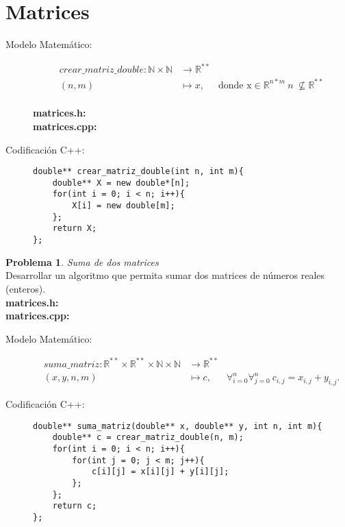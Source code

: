 \documentclass{article}
\theoremstyle{plain}
\theoremstyle{definition}
\newtheorem{problem}{Problema}
\begin{document}
\section{Matrices}
\begin{description}
\item[Modelo Matemático:]
\begin{align*}
crear\_matriz\_double: \mathbb{N}\times\mathbb{N} &\to \mathbb{R}^{**}\\
(n,m) &\mapsto x,& \text{donde x} \in \mathbb{R}^{n*m} \ n\ \not\subseteq \mathbb{R}^{**}
\end{align*}\\
\textbf{matrices.h:}\ \\
\textbf{matrices.cpp:}\ 
%
\item[Codificación \textsf{C++}:]\hfill 
%
\begin{verbatim}
double** crear_matriz_double(int n, int m){
    double** X = new double*[n];
    for(int i = 0; i < n; i++){
        X[i] = new double[m];
    };
    return X;
};
\end{verbatim}
\end{description}
%
\begin{problem} \emph{Suma de dos matrices}\\
Desarrollar un algoritmo que permita sumar dos matrices de números reales (enteros).\\
\textbf{matrices.h:}\ \\
\textbf{matrices.cpp:}\ 
%
\begin{description}
\item[Modelo Matemático:]
%
\begin{align*}
suma\_matriz: \mathbb{R}^{**}\times\mathbb{R}^{**}\times\mathbb{N}\times\mathbb{N} &\to \mathbb{R}^{**}\\
(x,y,n,m) &\mapsto c,& \forall_{i=0}^{n}\forall_{j=0}^{n}\ c_{i,j} = x_{i,j} + y_{i,j}.
\end{align*}
%
\item[Codificación \textsf{C++}:]\hfill
%
\begin{verbatim}
double** suma_matriz(double** x, double** y, int n, int m){
    double** c = crear_matriz_double(n, m);
    for(int i = 0; i < n; i++){
        for(int j = 0; j < m; j++){
            c[i][j] = x[i][j] + y[i][j];
        };
    };
    return c;
};
\end{verbatim}
\end{description}
\end{problem}
\end{document}
